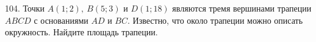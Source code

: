 104. Точки $A(1;2),\ B(5;3)$ и $D(1;18)$ являются тремя вершинами трапеции
$ABCD$ с основаниями $AD$ и $BC.$ Известно, что около трапеции можно описать окружность. Найдите площадь трапеции.\\
